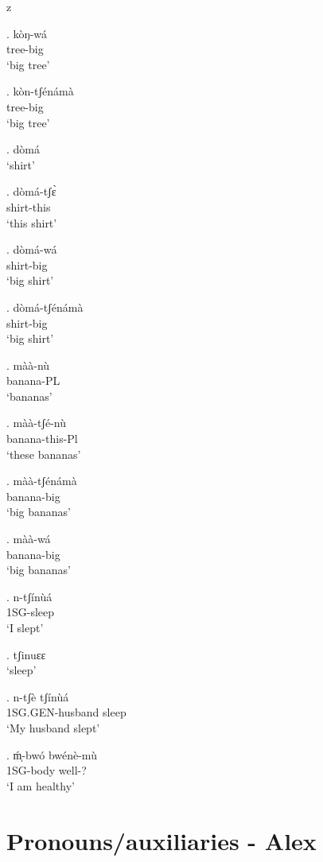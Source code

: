 z   \documentclass{assets/fieldnotes}
\begin{document}
 \exg. kòŋ-wá\\
tree-big\\
`big tree'

\exg. kòn-tʃénámà\\
tree-big\\
`big tree'



\ex. dòmá\\
`shirt'

\exg. dòmá-tʃɛ̀\\
shirt-this\\
`this shirt'


\exg. dòmá-wá\\
shirt-big\\
`big shirt'

\exg. dòmá-tʃénámà\\
shirt-big\\
`big shirt'


\exg. màà-nù\\
banana-PL\\
`bananas'

\exg. màà-tʃé-nù\\
banana-this-Pl\\
`these bananas'

\exg. màà-tʃénámà\\
banana-big\\
`big bananas'

\exg. màà-wá\\
banana-big\\
`big bananas'


\exg. n-tʃínùá\\
1SG-sleep\\
`I slept'

\ex. tʃinuɛɛ\\
`sleep'

\exg. n-tʃè tʃínùá\\
1SG.GEN-husband sleep\\
`My husband slept'

\ex. ḿ̩-bwó bwénè-mù\\
1SG-body well-?\\
`I am healthy'

\section{Pronouns/auxiliaries - Alex}
\end{document}
